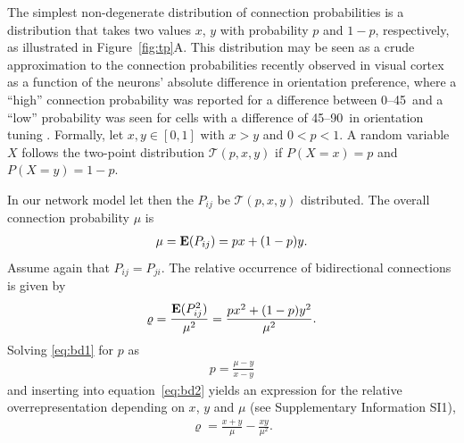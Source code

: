 
The simplest non-degenerate distribution of connection probabilities
is a distribution that takes two values $x$, $y$ with probability $p$
and $1-p$, respectively, as illustrated in Figure~\ref{fig:tp}A. %
%
This distribution may be seen as a crude approximation to the
connection probabilities recently observed in visual cortex as a
function of the neurons' absolute difference in orientation preference, where a \enquote{high} connection probability was reported for a difference between 0\textdegree--45\textdegree\ and a \enquote{low} probability was seen for cells with a difference of 45\textdegree--90\textdegree\ in orientation tuning \cite{Lee2016a}.
%
Formally, let $x,y \in [0,1]$ with $x > y$ and $0 < p
< 1$. A random variable $X$ follows the two-point distribution 
$\mathcal{T}(p,x,y)$ if $P(X=x)=p$ and $P(X=y) = 1-p$.
%

%
In our network model let then the $P_{ij}$ be $\mathcal{T}(p,x,y)$
distributed. The overall connection probability $\mu$ is
\begin{align}
\mu = \operatorname{\mathbf{E}}(P_{ij}) = px + (1-p)y. \label{eq:bd1}
\end{align}
Assume again that $P_{ij} = P_{ji}$. The relative occurrence of
bidirectional connections is given by
\begin{align}
  \varrho = \frac{\operatorname{\mathbf{E}}(P_{ij}^2)}{\mu^2} = \frac{p x^2 + (1-p) y^2}{\mu^2} \label{eq:bd2}.
\end{align}
Solving \eqref{eq:bd1} for $p$ as
\begin{align}
p = \frac{\mu - y}{x-y}
\end{align}
and inserting into equation~\eqref{eq:bd2} yields an expression for
the relative overrepresentation depending on $x$, $y$ and $\mu$ (see
Supplementary Information SI1),
\begin{align}
\varrho = \frac{x+y}{\mu} - \frac{xy}{\mu^2}.
\end{align}

